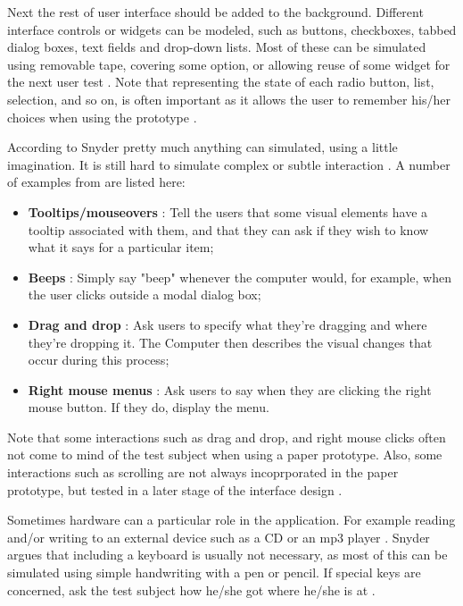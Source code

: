 Next the rest of user interface should be added to the background. Different interface controls or widgets can be modeled, such as buttons, checkboxes, tabbed dialog boxes, text fields and drop-down lists. Most of these can be simulated using removable tape, covering some option, or allowing reuse of some widget for the next user test \cite{Snyder:2003}. Note that representing the state of each radio button, list, selection, and so on, is often important as it allows the user to remember his/her choices when using the prototype \cite{Snyder:2003}.

According to Snyder pretty much anything can simulated, using a little imagination. It is still hard to simulate complex or subtle interaction \cite{Snyder:2003}. A number of examples from \cite{Snyder:2003} are listed here:
\begin{itemize}
	\item \textbf{Tooltips/mouseovers} : Tell the users that some visual elements have a tooltip associated with them, and that they can ask if they wish to know what it says for a particular item;
	\item \textbf{Beeps} : Simply say "beep" whenever the computer would, for example, when the user clicks outside a modal dialog box;
	\item \textbf{Drag and drop} : Ask users to specify what they're dragging and where they're dropping it. The Computer then describes the visual changes that occur during this process;
	\item \textbf{Right mouse menus} : Ask users to say when they are clicking the right mouse button. If they do, display the menu.
\end{itemize}


Note that some interactions such as drag and drop, and right mouse clicks often not come to mind of the test subject when using a paper prototype. Also, some interactions such as scrolling are not always incoprporated in the paper prototype, but tested in a later stage of the interface design \cite{Snyder:2003}.

Sometimes hardware can a particular role in the application. For example reading and/or writing to an external device such as a CD or an mp3 player \cite{Snyder:2003}. Snyder argues that including a keyboard is usually not necessary, as most of this can be simulated using simple handwriting with a pen or pencil. If special keys are concerned, ask the test subject how he/she got where he/she is at \cite{Snyder:2003}.



